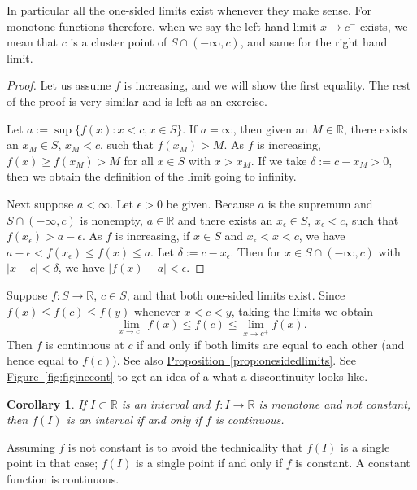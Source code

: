 \documentclass[12pt]{book}
\newcommand{\abs}[1]{\left\lvert {#1} \right\rvert}
\newcommand{\R}{{\mathbb{R}}}
\theoremstyle{plain}
\newtheorem{cor}[thm]{Corollary}
\theoremstyle{remark}
\theoremstyle{definition}
\theoremstyle{exercise}
\theoremstyle{example}
\newcommand{\figureref}[1]{\hyperref[#1]{Figure~\ref*{#1}}}
\newcommand{\propref}[1]{\hyperref[#1]{Proposition~\ref*{#1}}}
\begin{document}
In particular all the one-sided limits exist whenever they make
sense.  For monotone functions therefore, when we say
the left hand limit $x \to c^-$
exists, we mean that $c$ is a cluster point of $S \cap (-\infty,c)$,
and same for the right hand limit.

\begin{proof}
Let us assume $f$ is increasing, and we will show the first
equality.  The rest of the proof is very similar and is left as an
exercise.

Let $a := \sup \{ f(x) : x < c, x \in S \}$.  If $a = \infty$,
then given an $M \in \R$, there exists an $x_M \in S$, $x_M < c$, such that $f(x_M) > M$. 
As $f$ is increasing, $f(x) \geq f(x_M) >  M$ for all $x \in S$ with $x > x_M$.  If
we take $\delta := c-x_M > 0$, then we obtain the definition of the limit going to
infinity.

Next suppose $a < \infty$.
Let $\epsilon > 0$ be given.  Because $a$ is the supremum and
$S \cap (-\infty,c)$ is nonempty, $a \in \R$ and
there exists an
$x_\epsilon \in S$,
$x_\epsilon < c$,
such that $f(x_\epsilon) > a-\epsilon$.  As $f$ is increasing,
if $x \in S$ and $x_\epsilon < x < c$, we have
$a-\epsilon < f(x_\epsilon) \leq f(x) \leq a$.  Let
$\delta := c-x_\epsilon$.  Then for $x \in S \cap (-\infty,c)$
with $\abs{x-c} < \delta$,
we have $\abs{f(x)-a} < \epsilon$.
\end{proof}

Suppose $f \colon S \to \R$, $c \in S$, and
that both one-sided limits exist.
Since $f(x) \leq f(c) \leq f(y)$
whenever $x < c < y$, taking the limits we obtain
\begin{equation*}
\lim_{x \to c^-} f(x) \leq f(c) \leq \lim_{x \to c^+} f(x) .
\end{equation*}
Then $f$ is continuous at $c$ if and only if both limits are equal
to each other (and hence equal to $f(c)$).  See also
\propref{prop:onesidedlimits}.
See \figureref{fig:figinccont} to get an idea of a what a discontinuity
looks like.


\begin{cor} \label{cor:continterval}
If $I \subset \R$ is an interval and $f \colon I \to \R$ is 
monotone and not constant, then $f(I)$ is an interval if and only if $f$
is continuous.
\end{cor}

Assuming $f$ is not constant is to avoid the technicality
that $f(I)$ is a single point in that case; $f(I)$ is a single
point if and only if $f$ is constant.  A constant function is 
continuous.
\end{document}
